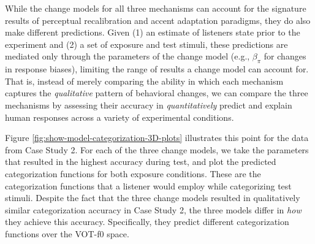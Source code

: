 \documentclass[
  11pt,
  man,floatsintext]{apa6}
\begin{document}
While the change models for all three mechanisms can account for the signature results of perceptual recalibration and accent adaptation paradigms, they do also make different predictions.
Given (1) an estimate of listeners state prior to the experiment and (2) a set of exposure and test stimuli, these predictions are mediated only through the parameters of the change model (e.g., \(\beta_{\pi}\) for changes in response biases), limiting the range of results a change model can account for. That is, instead of merely comparing the ability in which each mechanism captures the \emph{qualitative} pattern of behavioral changes, we can compare the three mechanisms by assessing their accuracy in \emph{quantitatively} predict and explain human responses across a variety of experimental conditions.

Figure \ref{fig:show-model-categorization-3D-plots} illustrates this point for the data from Case Study 2. For each of the three change models, we take the parameters that resulted in the highest accuracy during test, and plot the predicted categorization functions for both exposure conditions. These are the categorization functions that a listener would employ while categorizing test stimuli. Despite the fact that the three change models resulted in qualitatively similar categorization accuracy in Case Study 2, the three models differ in \emph{how} they achieve this accuracy. Specifically, they predict different categorization functions over the VOT-f0 space.
\end{document}
